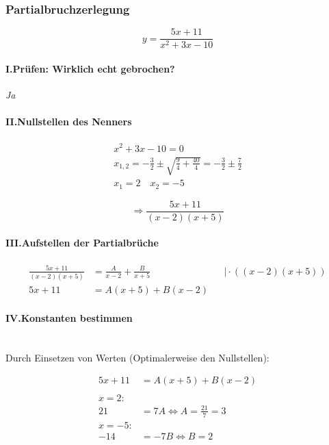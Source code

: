\subsubsection{Partialbruchzerlegung}

\[
    y = \frac{5x + 11}{x^2 + 3x - 10}    
\]

\paragraph{I.\;Prüfen: Wirklich echt gebrochen?}

\textit{Ja}

\paragraph{II.\;Nullstellen des Nenners}

\begin{gather*}
    x^2 + 3x - 10 = 0 \\
    x_{1,2} = -\frac{3}{2} \pm \sqrt{\frac{9}{4}+ \frac{40}{4}} = -\frac{3}{2} \pm \frac{7}{2} \\
    x_1 = 2 \quad x_2 = -5
\end{gather*}

\[
    \Rightarrow \frac{5x + 11}{(x-2)(x + 5)}
\]

\paragraph{III.\;Aufstellen der Partialbrüche}

\begin{align*}
    \frac{5x + 11}{(x-2)(x + 5)} &= \frac{A}{x - 2} + \frac{B}{x + 5} &&\mid \cdot ((x-2)(x+5)) \\
    5x + 11 &= A(x + 5) + B(x - 2)
\end{align*}

\paragraph{IV.\;Konstanten bestimmen} \leavevmode \\
Durch Einsetzen von Werten (Optimalerweise den Nullstellen):

\begin{align*}
    5x + 11 &= A(x + 5) + B(x - 2) \\
    \\
    x = 2:\\
    21 &= 7A  \Leftrightarrow A = \frac{21}{7} = 3 \\
    x = -5:\\
    -14 &= -7B \Leftrightarrow B = 2
\end{align*}

